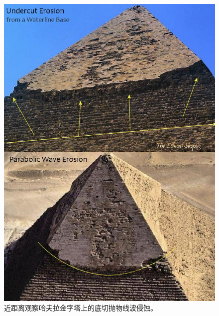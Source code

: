 \documentclass[10pt,twocolumn,letterpaper]{article}
\begin{document}
\begin{figure}[H]
\begin{center}
   \includegraphics[width=1\linewidth]{wave.jpg}
\end{center}
   \caption{近距离观察哈夫拉金字塔上的底切抛物线波侵蚀\cite{27}。}
\label{fig:19}
\label{fig:onecol}
\end{figure}
\end{document}
